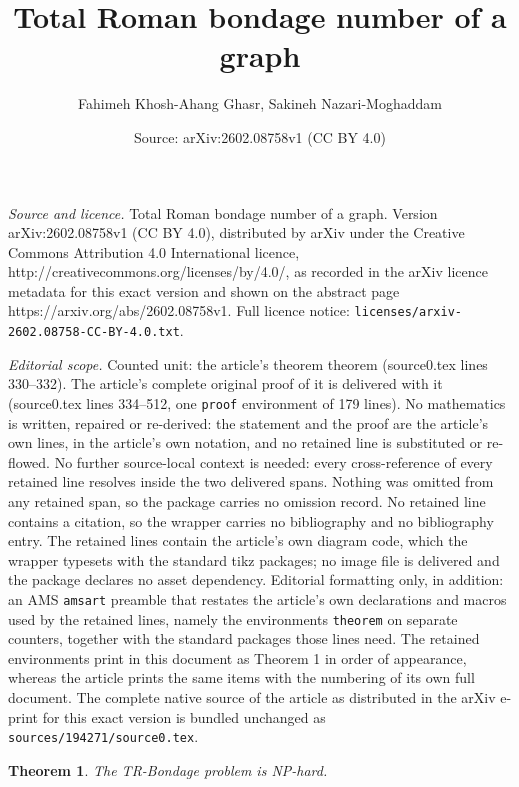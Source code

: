 \documentclass[10pt,a4paper]{amsart}
\title{Total Roman bondage number of a graph}
\author{Fahimeh Khosh-Ahang Ghasr, Sakineh Nazari-Moghaddam}
\date{Source: arXiv:2602.08758v1 (CC BY 4.0)}
\newtheorem{theorem}{Theorem}
\begin{document}
\maketitle

\noindent\emph{Source and licence.} Total Roman bondage number of a graph. Version arXiv:2602.08758v1 (CC BY 4.0), distributed by arXiv under the Creative Commons Attribution 4.0 International licence, http://creativecommons.org/licenses/by/4.0/, as recorded in the arXiv licence metadata for this exact version and shown on the abstract page https://arxiv.org/abs/2602.08758v1. Full licence notice: \texttt{licenses/arxiv-2602.08758-CC-BY-4.0.txt}.\par\smallskip

\noindent\textit{Editorial scope.} Counted unit: the article's theorem theorem (source0.tex lines 330--332). The article's complete original proof of it is delivered with it (source0.tex lines 334--512, one \texttt{proof} environment of 179 lines). No mathematics is written, repaired or re-derived: the statement and the proof are the article's own lines, in the article's own notation, and no retained line is substituted or re-flowed.  No further source-local context is needed: every cross-reference of every retained line resolves inside the two delivered spans.  Nothing was omitted from any retained span, so the package carries no omission record.  No retained line contains a citation, so the wrapper carries no bibliography and no bibliography entry.  The retained lines contain the article's own diagram code, which the wrapper typesets with the standard tikz packages; no image file is delivered and the package declares no asset dependency.  Editorial formatting only, in addition: an AMS \texttt{amsart} preamble that restates the article's own declarations and macros used by the retained lines, namely the environments \texttt{theorem} on separate counters, together with the standard packages those lines need.  The retained environments print in this document as Theorem 1 in order of appearance, whereas the article prints the same items with the numbering of its own full document.  The complete native source of the article as distributed in the arXiv e-print for this exact version is bundled unchanged as \texttt{sources/194271/source0.tex}.
\begin{theorem}
The TR-Bondage problem is NP-hard.
\end{theorem}
\end{document}
